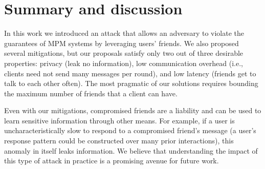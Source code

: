 \section{Summary and discussion}\label{s:disc}

In this work we introduced an attack that allows an adversary to violate the 
  guarantees of MPM systems by leveraging users' friends.
We also proposed several mitigations, but our proposals satisfy only two out 
  of three desirable properties: privacy (leak no information), low 
  communication overhead (i.e., clients need not send many messages per round), 
  and low latency (friends get to talk to each other often).
The most pragmatic of our solutions requires bounding the maximum number of 
  friends that a client can have.

Even with our mitigations, compromised friends are a liability and can be
  used to learn sensitive information through other means.
For example, if a user is uncharacteristically slow to respond to a 
  compromised friend's message (a user's response pattern could be constructed over
  many prior interactions), this anomaly in itself leaks information.
We believe that understanding the impact of this type of attack in
  practice is a promising avenue for future work.
